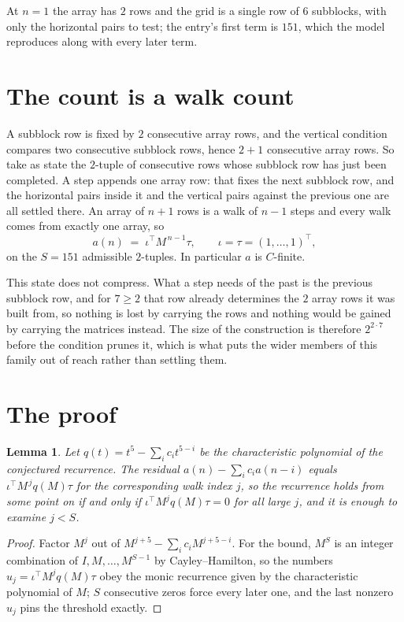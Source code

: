 \documentclass[11pt,a4paper]{article}
\theoremstyle{plain}
\newtheorem{lemma}[theorem]{Lemma}
\theoremstyle{definition}
\begin{document}
At $n=1$ the array has $2$ rows and the grid is a single row of $6$
subblocks, with only the horizontal pairs to test; the entry's first term is
$151$, which the model reproduces along with every later term.

\section{The count is a walk count}

A subblock row is fixed by $2$ consecutive array rows, and the vertical condition compares
two consecutive subblock rows, hence $2+1$ consecutive array rows. So take as state the
$2$-tuple of consecutive rows whose subblock row has just been completed. A step appends one
array row: that fixes the next subblock row, and the horizontal pairs inside it and the
vertical pairs against the previous one are all settled there. An array of $n+1$ rows is
a walk of $n-1$ steps and every walk comes from exactly one array, so
\[
a(n)\;=\;\iota^{\!\top}M^{\,n-1}\tau,\qquad\iota=\tau=(1,\dots,1)^{\!\top},
\]
on the $S=151$ admissible $2$-tuples. In particular $a$ is $C$-finite.

This state does not compress. What a step needs of the past is the previous subblock row, and
for $7\ge2$ that row already determines the $2$ array rows it was built from, so nothing
is lost by carrying the rows and nothing would be gained by carrying the matrices instead. The
size of the construction is therefore $2^{2\cdot7}$ before the condition prunes
it, which is what puts the wider members of this family out of reach rather than settling them.

\section{The proof}

\begin{lemma}\label{lem:crit}
Let $q(t)=t^{5}-\sum_i c_it^{5-i}$ be the characteristic polynomial of the
conjectured recurrence. The residual $a(n)-\sum_ic_ia(n-i)$ equals
$\iota^{\!\top}M^{\,j}q(M)\tau$ for the corresponding walk index $j$, so the recurrence
holds from some point on if and only if $\iota^{\!\top}M^{j}q(M)\tau=0$ for all large $j$,
and it is enough to examine $j<S$.
\end{lemma}

\begin{proof}
Factor $M^{j}$ out of $M^{j+5}-\sum_ic_iM^{j+5-i}$. For the bound, $M^{S}$
is an integer combination of $I,M,\dots,M^{S-1}$ by Cayley--Hamilton, so the numbers
$u_j=\iota^{\!\top}M^{j}q(M)\tau$ obey the monic recurrence given by the characteristic
polynomial of $M$; $S$ consecutive zeros force every later one, and the last nonzero $u_j$
pins the threshold exactly.
\end{proof}
\end{document}
